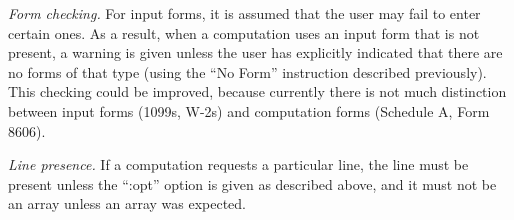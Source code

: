 \emph{Form checking.} For input forms, it is assumed that the user may fail to
enter certain ones. As a result, when a computation uses an input form that is
not present, a warning is given unless the user has explicitly indicated that
there are no forms of that type (using the ``No Form'' instruction described
previously). This checking could be improved, because currently there is not
much distinction between input forms (1099s, W-2s) and computation forms
(Schedule A, Form 8606).

\emph{Line presence.} If a computation requests a particular line, the line must
be present unless the ``:opt'' option is given as described above, and it must
not be an array unless an array was expected.



